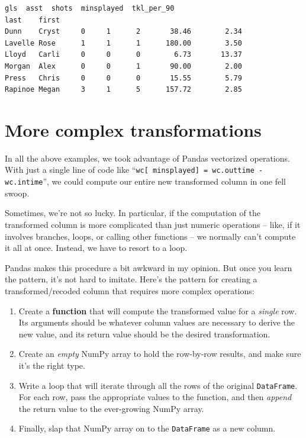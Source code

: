 \begin{Verbatim}[fontsize=\small,samepage=true,frame=leftline,framesep=5mm,framerule=1mm]
                gls  asst  shots  minsplayed  tkl_per_90
last    first                                                
Dunn    Cryst     0     1      2       38.46        2.34
Lavelle Rose      1     1      1      180.00        3.50
Lloyd   Carli     0     0      0        6.73       13.37
Morgan  Alex      0     0      1       90.00        2.00
Press   Chris     0     0      0       15.55        5.79
Rapinoe Megan     3     1      5      157.72        2.85
\end{Verbatim}

\section{More complex transformations}


In all the above examples, we took advantage of Pandas vectorized operations.
With just a single line of code like ``\texttt{wc[\textquotesingle
minsplayed\textquotesingle] = wc.outtime - wc.intime}'', we could compute
our entire new transformed column in one fell swoop.


Sometimes, we're not so lucky. In particular, if the computation of the
transformed column is more complicated than just numeric operations -- like, if
it involves branches, loops, or calling other functions -- we normally can't
compute it all at once. Instead, we have to resort to a loop.

Pandas makes this procedure a bit awkward in my opinion. But once you learn the
pattern, it's not hard to imitate. Here's the pattern for creating a
transformed/recoded column that requires more complex operations:

\begin{shaded}
\begin{enumerate}[nosep]
\item Create a \textbf{function} that will compute the transformed value for a
\textit{single} row. Its arguments should be whatever column values are
necessary to derive the new value, and its return value should be the desired
transformation.
\item Create an \textit{empty} NumPy array to hold the row-by-row results, and
make sure it's the right type.
\item Write a loop that will iterate through all the rows of the original
\texttt{DataFrame}. For each row, pass the appropriate values to the function,
and then \textit{append} the return value to the ever-growing NumPy array.
\item Finally, slap that NumPy array on to the \texttt{DataFrame} as a new
column.
\end{enumerate}

\end{shaded}

